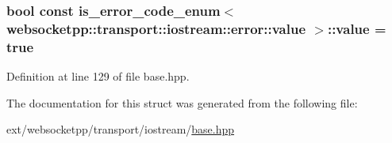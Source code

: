 \subsubsection[{value}]{\setlength{\rightskip}{0pt plus 5cm}bool const is\+\_\+error\+\_\+code\+\_\+enum$<$ {\bf websocketpp\+::transport\+::iostream\+::error\+::value} $>$\+::value = true\hspace{0.3cm}{\ttfamily [static]}}\label{structis__error__code__enum_3_01websocketpp_1_1transport_1_1iostream_1_1error_1_1value_01_4_a8d3f807aad82dad37582b8331d2d077a}


Definition at line 129 of file base.\+hpp.



The documentation for this struct was generated from the following file\+:\begin{DoxyCompactItemize}
\item 
ext/websocketpp/transport/iostream/\hyperlink{transport_2iostream_2base_8hpp}{base.\+hpp}\end{DoxyCompactItemize}
